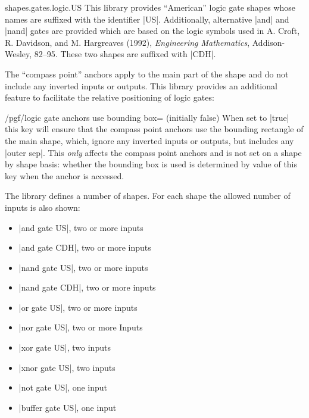 \begin{pgflibrary}{shapes.gates.logic.US}
  This library provides ``American'' logic gate shapes whose names are
  suffixed with the identifier |US|. Additionally,
  alternative |and| and |nand| gates are provided which are based on the
  logic symbols used in A. Croft, R. Davidson, and M. Hargreaves (1992),
  \emph{Engineering Mathematics}, Addison-Wesley, 82--95. These two
  shapes are suffixed with |CDH|.

  The ``compass point'' anchors apply to the main part of the shape
  and do not include any inverted inputs or outputs. This library
  provides an additional feature to facilitate the relative positioning
  of logic gates:

\begin{key}{/pgf/logic gate anchors use bounding box= (initially false)}
  When set to |true| this key will ensure that the
  compass point anchors use the bounding rectangle of the
  main shape, which, ignore any inverted inputs or outputs, but
  includes any |outer sep|.
  This \emph{only} affects the compass point anchors
  and is not set on a shape by shape basis: whether the bounding
  box is used is determined by value of this key when the anchor
  is accessed.

\begin{codeexample}[]
\end{codeexample}

\end{key}

  The library defines a number of shapes. For each shape the allowed
  number of inputs is also shown:
  \begin{itemize}
  \item |and gate US|, two or more inputs
  \item |and gate CDH|, two or more inputs
  \item |nand gate US|, two or more inputs
  \item |nand gate CDH|, two or more inputs
  \item |or gate US|, two or more inputs
  \item |nor gate US|, two or more Inputs
  \item |xor gate US|, two inputs
  \item |xnor gate US|, two inputs
  \item |not gate US|, one input
  \item |buffer gate US|, one input
  \end{itemize}


\end{pgflibrary}

